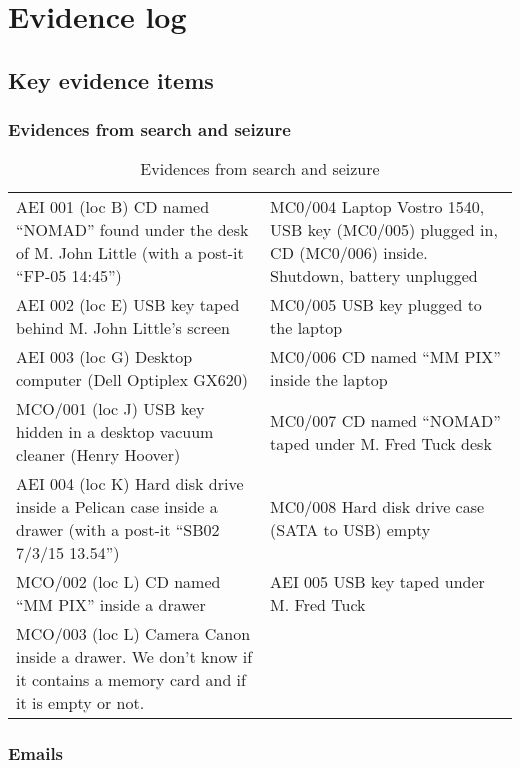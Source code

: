 \section{Evidence log}
\subsection{Key evidence items}
\subsubsection{Evidences from search and seizure}
\begin{table}[H]
    \begin{tabularx}{.9\textwidth}{|X|X|}
	\heading{\textbf{M. John Little}} & \heading{\textbf{M. Fred Tuck}}\\\hline
	AEI 001 (loc B) CD named \enquote{NOMAD} found under the desk of M. John Little (with a post-it \enquote{FP-05 14:45}) & MC0/004 Laptop Vostro 1540, USB key (MC0/005) plugged in, CD (MC0/006) inside. Shutdown, battery unplugged\\\hline
	AEI 002 (loc E) USB key taped behind M. John Little's screen & MC0/005 USB key plugged to the laptop\\\hline
	AEI 003 (loc G) Desktop computer (Dell Optiplex GX620) & MC0/006 CD named \enquote{MM PIX} inside the laptop\\\hline
	MCO/001 (loc J) USB key hidden in a desktop vacuum cleaner (Henry Hoover) & MC0/007 CD named \enquote{NOMAD} taped under M. Fred Tuck desk\\\hline
	AEI 004 (loc K) Hard disk drive inside a Pelican case inside a drawer (with a post-it \enquote{SB02 7/3/15 13.54}) & MC0/008 Hard disk drive case (SATA to USB) empty\\\hline
	MCO/002 (loc L) CD named \enquote{MM PIX} inside a drawer & AEI 005 USB key taped under M. Fred Tuck\\\hline
	MCO/003 (loc L) Camera Canon inside a drawer. We don't know if it contains a memory card and if it is empty or not. & \\\hline
    \end{tabularx}
    \caption{Evidences from search and seizure}
\end{table}
\subsubsection{Emails}
